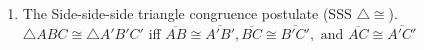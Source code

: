 \documentclass[12pt, oneside]{article}
\begin{document}
\begin{enumerate}
\item The Side-side-side triangle congruence postulate (SSS $\triangle \cong$).\\
$\triangle ABC \cong \triangle A'B'C'$ iff $\overline{AB} \cong \overline{A'B'}, \overline{BC} \cong \overline{B'C'}, \text{ and } \overline{AC} \cong \overline{A'C'}$

  \end{enumerate}
\end{document}
